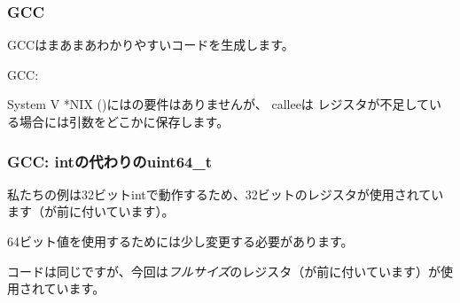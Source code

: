 \subsubsection{GCC}

\Optimizing GCCはまあまあわかりやすいコードを生成します。



\NonOptimizing GCC:




System V *NIX (\SysVABI)にはの要件はありませんが、 \gls{callee}は
レジスタが不足している場合には引数をどこかに保存します。

\subsubsection{GCC: intの代わりのuint64\_t}

私たちの例は32ビットintで動作するため、32ビットのレジスタが使用されています（が前に付いています）。 

64ビット値を使用するためには少し変更する必要があります。





コードは同じですが、今回は\emph{フルサイズ}のレジスタ（が前に付いています）が使用されています。
